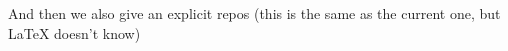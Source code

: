 \documentclass[minimal]{omdoc}
\begin{document}

And then we also give an explicit repos (this is the same as  the current one, but {\LaTeX}
doesn't know)

\end{document}
